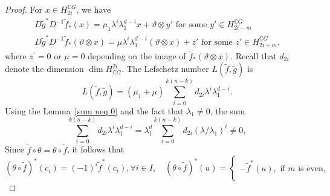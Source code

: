 \documentclass{amsart}
\newcommand{\lemref}[1]{Lemma~\ref{#1}}
\begin{document}
\begin{proof}
	For $x\in H_{2i}^{\mathbb{C}G}$, we %
have 
	\begin{equation*}\label{D cal}
		\begin{split}
			D\tilde g^* D^{-1} \tilde f_*(x)=\mu_1 \lambda^i\lambda_1^{d-i} x + \vartheta\otimes y'\text{ for some }y' \in H^{\mathbb CG}_{2i-m}\\
			D\tilde g^* D^{-1} \tilde f_*(\vartheta\otimes x)= \mu \lambda^i\lambda_1^{d-i}(\vartheta\otimes x)+z' \text{ for some }z'\in H_{2i+m}^{\mathbb CG}.
		\end{split}
	\end{equation*}
	where %
$z^{'} =0$ or $\mu =0$ depending on the image of $\tilde{f}_*(\vartheta \otimes x)$.
	Recall that  %
$d_{2i}$ denote the %
dimension $\dim H^{2i}_{\mathbb CG}$. The Lefschetz number  $L(\tilde{f},\tilde g)$ is
	\begin{equation*}\label{L(f,g)}
		L(\tilde f,\tilde g) =(\mu_1 + \mu) \sum_{i=0}^{k(n-k)} d_{2i} \lambda^i\lambda_1^{d-i}.
	\end{equation*}
Using the \lemref{sum neq 0} and %
the fact that $\lambda_1\neq 0$, the %
sum
	\[
	\sum_{i=0}^{k(n-k)} d_{2i} \lambda^i\lambda_1^{d-i}=\lambda_1^d\sum_{i=0}^{k(n-k)} d_{2i} (\lambda/\lambda_1)^i\neq 0,
	\]
	Since %
$\tilde f\circ\theta=\theta\circ \tilde f$, it follows that $$(\theta\circ \tilde  f )^*(c_i)= (-1)^i \tilde{f}^*(c_i), \forall i \in I, \quad (\theta \circ\tilde  f)^*(u)=\begin{cases}
		-\tilde  f^*(u), \text{ if } m \text{ is even,}\\

\end{cases}$$
\end{proof}
\end{document}
